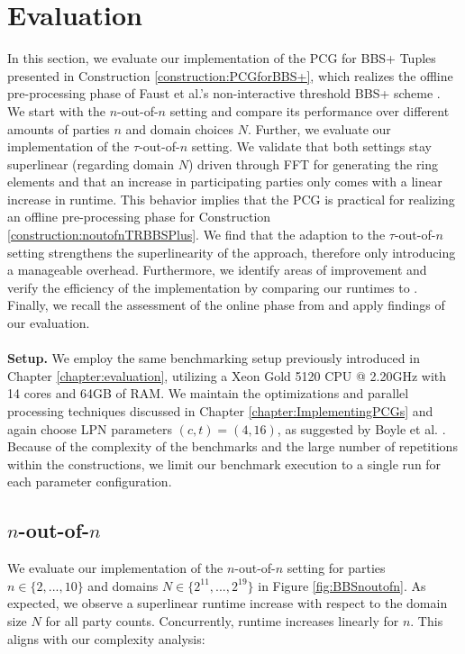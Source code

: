 \section{Evaluation}
\label{sec:evalBBSPlusPCG}
In this section, we evaluate our implementation of the PCG for BBS+ Tuples presented in Construction \ref{construction:PCGforBBS+}, which realizes the offline pre-processing phase of Faust et al.'s non-interactive threshold BBS+ scheme \cite{cryptoeprint:2023/1076}. We start with the $n$-out-of-$n$ setting and compare its performance over different amounts of parties $n$ and domain choices $N$. Further, we evaluate our implementation of the $\tau$-out-of-$n$ setting. We validate that both settings stay superlinear (regarding domain $N$) driven through FFT for generating the ring elements and that an increase in participating parties only comes with a linear increase in runtime. This behavior implies that the PCG is practical for realizing an offline pre-processing phase for Construction \ref{construction:noutofnTRBBSPlus}. We find that the adaption to the $\tau$-out-of-$n$ setting strengthens the superlinearity of the approach, therefore only introducing a manageable overhead. Furthermore, we identify areas of improvement and verify the efficiency of the implementation by comparing our runtimes to \cite{abram2022low}. Finally, we recall the assessment of the online phase from \cite{cryptoeprint:2023/1076} and apply findings of our evaluation.
\\\\
\textbf{Setup.} We employ the same benchmarking setup previously introduced in Chapter \ref{chapter:evaluation}, utilizing a Xeon Gold 5120 CPU @ 2.20GHz with 14 cores and 64GB of RAM. We maintain the optimizations and parallel processing techniques discussed in Chapter \ref{chapter:ImplementingPCGs} and again choose LPN parameters $(c,t)=(4,16)$, as suggested by Boyle et al. \cite{boyle2020efficient}. Because of the complexity of the benchmarks and the large number of repetitions within the constructions, we limit our benchmark execution to a single run for each parameter configuration.

\subsection{$n$-out-of-$n$}
We evaluate our implementation of the $n$-out-of-$n$ setting for parties $n\in \{2, ..., 10\}$ and domains $N\in \{2^{11}, ...,2^{19}\}$ in Figure \ref{fig:BBSnoutofn}. As expected, we observe a superlinear runtime increase with respect to the domain size $N$ for all party counts. Concurrently, runtime increases linearly for $n$. This aligns with our complexity analysis:

